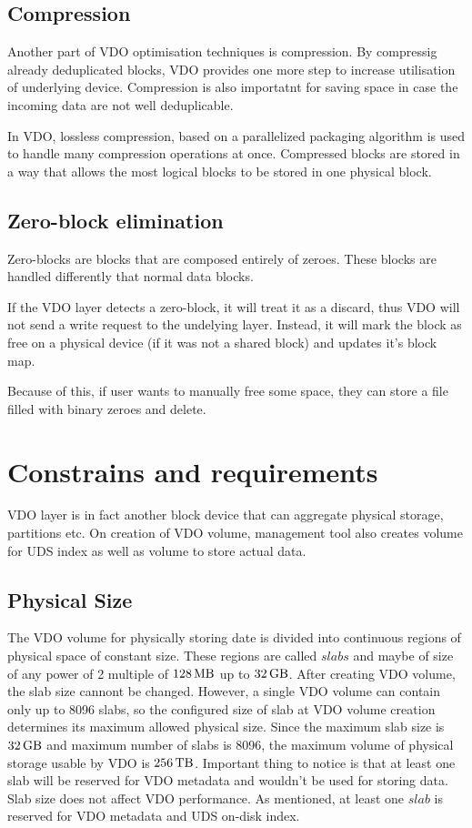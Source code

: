 \documentclass[
  color, %
  table, %
  lof,   %
  lot,   %
]{fithesis3}
\begin{document}
\subsection{Compression}
Another part of VDO optimisation techniques is compression. By compressig already deduplicated blocks, VDO provides one more step to increase utilisation of underlying device. Compression is also importatnt for saving space in case the incoming data are not well deduplicable.

In VDO, lossless compression, based on a parallelized packaging algorithm is used to handle many compression operations at once. Compressed blocks are stored in a way that allows the most logical blocks to be stored in one physical block.


\subsection{Zero-block elimination}
Zero-blocks are blocks that are composed entirely of zeroes. These blocks are handled differently that normal data blocks.

If the VDO layer detects a zero-block, it will treat it as a discard, thus VDO will not send a write request to the undelying layer. Instead, it will mark the block as free on a physical device (if it was not a shared block) and updates it's block map.

Because of this, if user wants to manually free some space, they can store a file filled with binary zeroes and delete.


\section{Constrains and requirements}
VDO layer is in fact another block device that can aggregate physical storage, partitions etc. On creation of VDO volume, management tool also creates volume for UDS index as well as volume to store actual data.

\subsection{Physical Size}
The VDO volume for physically storing date is divided into continuous regions of physical space of constant size. These regions are called $slabs$ and maybe of size of any power of 2 multiple of $\SI{128}{\mega\byte}$  up to $\SI{32}{\giga\byte}$. After creating VDO volume, the slab size cannont be changed. However, a single VDO volume can contain only up to 8096 slabs, so the configured size of slab at VDO volume creation determines its maximum allowed physical size. Since the maximum slab size is $\SI{32}{\giga\byte}$ and maximum number of slabs is 8096, the maximum volume of physical storage usable by VDO is $\SI{256}{\tera\byte}$. Important thing to notice is that at least one slab will be reserved for VDO metadata and wouldn't be used for storing data. Slab size does not affect VDO performance. As mentioned, at least one $slab$ is reserved for VDO metadata and UDS on-disk index.
\end{document}
